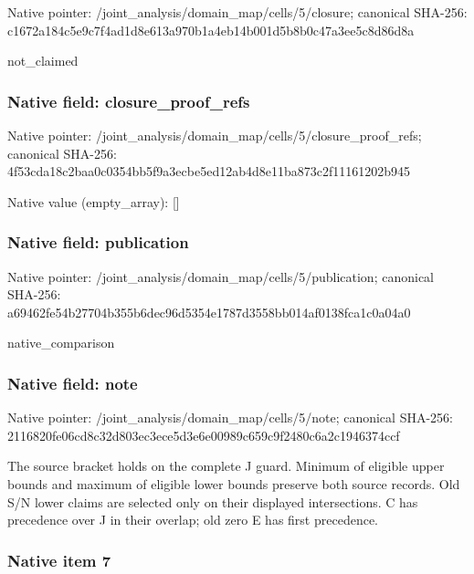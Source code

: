 \documentclass[10pt,a4paper]{article}
\begin{document}
Native pointer: /joint\_analysis/domain\_m\allowbreak{}ap/cells/5/closure; canonical SHA-256: c1672a184c5e9c7f4ad1d8e6\allowbreak{}13a970b1a4eb14b001d5b8b0\allowbreak{}c47a3ee5c8d86d8a


not\_claimed


\subsubsection{Native field: closure\_proof\_refs}


Native pointer: /joint\_analysis/domain\_m\allowbreak{}ap/cells/5/closure\_proof\allowbreak{}\_refs; canonical SHA-256: 4f53cda18c2baa0c0354bb5f\allowbreak{}9a3ecbe5ed12ab4d8e11ba87\allowbreak{}3c2f11161202b945



Native value (empty\_array): []



\subsubsection{Native field: publication}


Native pointer: /joint\_analysis/domain\_m\allowbreak{}ap/cells/5/publication; canonical SHA-256: a69462fe54b27704b355b6de\allowbreak{}c96d5354e1787d3558bb014a\allowbreak{}f0138fca1c0a04a0


native\_comparison


\subsubsection{Native field: note}


Native pointer: /joint\_analysis/domain\_map/cells/5/note; canonical SHA-256: 2116820fe06cd8c32d803ec3\allowbreak{}ece5d3e6e00989c659c9f248\allowbreak{}0c6a2c1946374ccf


The source bracket holds on the complete J guard. Minimum of eligible upper bounds and maximum of eligible lower bounds preserve both source records. Old S/N lower claims are selected only on their displayed intersections. C has precedence over J in their overlap; old zero E has first precedence.


\subsubsection{Native item 7}
\end{document}
